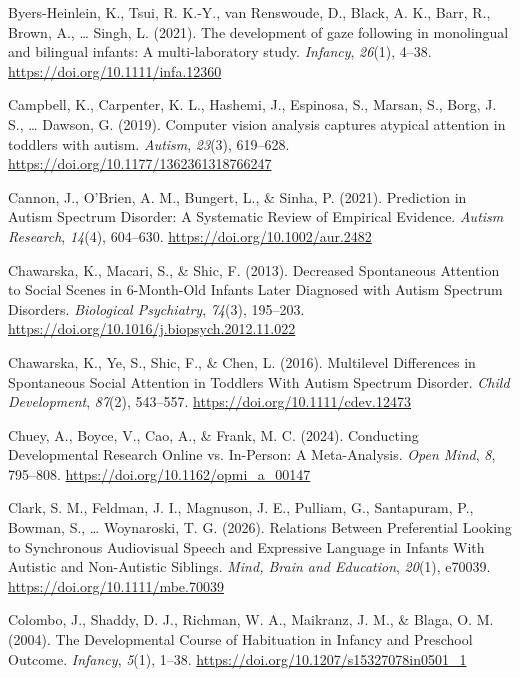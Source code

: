 \documentclass[
  english,
  man,floatsintext]{apa6}
\newlength{\cslhangindent}
\newenvironment{CSLReferences}[2] %
 {\begin{list}{}{%
  \setlength{\itemindent}{0pt}
  \setlength{\leftmargin}{0pt}
  \setlength{\parsep}{0pt}
  \ifodd #1
   \setlength{\leftmargin}{\cslhangindent}
   \setlength{\itemindent}{-1\cslhangindent}
  \fi
  \setlength{\itemsep}{#2\baselineskip}}}
 {\end{list}}
\begin{document}
\begin{CSLReferences}{1}{0}
{Byers-Heinlein, K., Tsui, R. K.-Y., van Renswoude, D., Black, A. K., Barr, R., Brown, A., \ldots{} Singh, L.} (2021). The development of gaze following in monolingual and bilingual infants: {A} multi-laboratory study. \emph{Infancy}, \emph{26}(1), 4--38. \url{https://doi.org/10.1111/infa.12360}

Campbell, K., Carpenter, K. L., Hashemi, J., Espinosa, S., Marsan, S., Borg, J. S., \ldots{} Dawson, G. (2019). Computer vision analysis captures atypical attention in toddlers with autism. \emph{Autism}, \emph{23}(3), 619--628. \url{https://doi.org/10.1177/1362361318766247}

Cannon, J., O'Brien, A. M., Bungert, L., \& Sinha, P. (2021). Prediction in {Autism Spectrum Disorder}: {A Systematic Review} of {Empirical Evidence}. \emph{Autism Research}, \emph{14}(4), 604--630. \url{https://doi.org/10.1002/aur.2482}

Chawarska, K., Macari, S., \& Shic, F. (2013). Decreased {Spontaneous Attention} to {Social Scenes} in 6-{Month-Old Infants Later Diagnosed} with {Autism Spectrum Disorders}. \emph{Biological Psychiatry}, \emph{74}(3), 195--203. \url{https://doi.org/10.1016/j.biopsych.2012.11.022}

Chawarska, K., Ye, S., Shic, F., \& Chen, L. (2016). Multilevel {Differences} in {Spontaneous Social Attention} in {Toddlers With Autism Spectrum Disorder}. \emph{Child Development}, \emph{87}(2), 543--557. \url{https://doi.org/10.1111/cdev.12473}

Chuey, A., Boyce, V., Cao, A., \& Frank, M. C. (2024). Conducting {Developmental Research Online} vs. {In-Person}: {A Meta-Analysis}. \emph{Open Mind}, \emph{8}, 795--808. \url{https://doi.org/10.1162/opmi_a_00147}

Clark, S. M., Feldman, J. I., Magnuson, J. E., Pulliam, G., Santapuram, P., Bowman, S., \ldots{} Woynaroski, T. G. (2026). Relations {Between Preferential Looking} to {Synchronous Audiovisual Speech} and {Expressive Language} in {Infants With Autistic} and {Non}-{Autistic Siblings}. \emph{Mind, Brain and Education}, \emph{20}(1), e70039. \url{https://doi.org/10.1111/mbe.70039}

Colombo, J., Shaddy, D. J., Richman, W. A., Maikranz, J. M., \& Blaga, O. M. (2004). The {Developmental Course} of {Habituation} in {Infancy} and {Preschool Outcome}. \emph{Infancy}, \emph{5}(1), 1--38. \url{https://doi.org/10.1207/s15327078in0501_1}


\end{CSLReferences}
\end{document}
